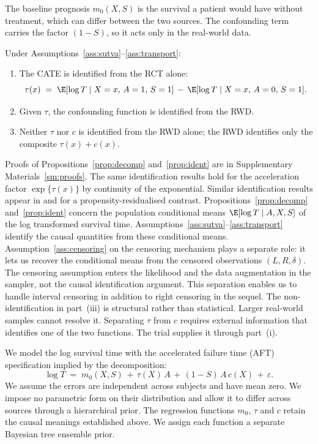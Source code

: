 The baseline prognosis $m_0(X, S)$ is the survival a patient would have without treatment, which can differ between the two sources.
The confounding term carries the factor $(1 - S)$, so it acts only in the real-world data.

\begin{proposition}[Identification]\label{prop:ident}
Under Assumptions~\ref{ass:sutva}--\ref{ass:transport}:
\begin{enumerate}[label=\textup{(\roman*)}]
\item The CATE is identified from the RCT alone:
\begin{equation}
\tau(x) \;=\; \E[\log T \mid X = x,\, A = 1,\, S = 1] \,-\, \E[\log T \mid X = x,\, A = 0,\, S = 1].
\label{eq:ident-tau}
\end{equation}
\item Given $\tau$, the confounding function is identified from the RWD.
\item Neither $\tau$ nor $c$ is identified from the RWD alone; the RWD identifies only the composite $\tau(x) + c(x)$.
\end{enumerate}
\end{proposition}

Proofs of Propositions~\ref{prop:decomp} and~\ref{prop:ident} are in Supplementary Materials~\ref{sm:proofs}.
The same identification results hold for the acceleration factor $\exp\{\tau(x)\}$ by continuity of the exponential.
Similar identification results appear in \citet{YangLiuZengWang2025} and \citet{Ye2025} for a propensity-residualised contrast.
Propositions~\ref{prop:decomp} and~\ref{prop:ident} concern the population conditional means $\E[\log T \mid A, X, S]$ of the log transformed survival time.
Assumptions~\ref{ass:sutva}--\ref{ass:transport} identify the causal quantities from these conditional means.
Assumption~\ref{ass:censoring} on the censoring mechanism plays a separate role: it lets us recover the conditional means from the censored observations $(L, R, \delta)$.
The censoring assumption enters the likelihood and the data augmentation in the sampler, not the causal identification argument.
This separation enables us to handle interval censoring in addition to right censoring in the sequel.
The non-identification in part~(iii) is structural rather than statistical.
Larger real-world samples cannot resolve it.
Separating $\tau$ from $c$ requires external information that identifies one of the two functions.
The trial supplies it through part~(i).

We model the log survival time with the accelerated failure time (AFT) specification implied by the decomposition:
\begin{equation}
\log T \;=\; m_0(X, S) \,+\, \tau(X)\,A  \,+\, (1 - S)\,A\,c(X) \,+\, \varepsilon.
\label{eq:aft-model}
\end{equation}
We assume the errors are independent across subjects and have mean zero.
We impose no parametric form on their distribution and allow it to differ across sources through a hierarchical prior.
The regression functions $m_0$, $\tau$ and $c$ retain the causal meanings established above.
We assign each function a separate Bayesian tree ensemble prior.


